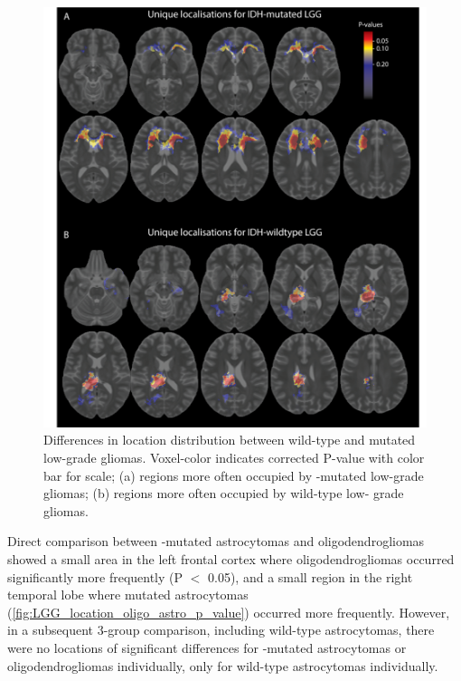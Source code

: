     \begin{figure}
    \centering
    \includegraphics[width=\textwidth]{Figures/Figure_2.png}
    \caption{Differences in location distribution between  wild-type and mutated low-grade gliomas. Voxel-color indicates corrected P-value with
    color bar for scale; (a) regions more often occupied by -mutated low-grade gliomas; (b) regions more often occupied by  wild-type low-
    grade gliomas.}
    \label{fig:LGG_location_P_values}
    \end{figure}


Direct comparison between -mutated astrocytomas and oligodendrogliomas showed a small area in the left frontal cortex where oligodendrogliomas occurred significantly more frequently (P $<$ 0.05), and a small region in the right temporal lobe where  mutated astrocytomas (\cref{fig:LGG_location_oligo_astro_p_value}) occurred more frequently.
However, in a subsequent 3-group comparison, including  wild-type astrocytomas, there were no locations of significant differences for -mutated astrocytomas or oligodendrogliomas individually, only for  wild-type astrocytomas individually.


